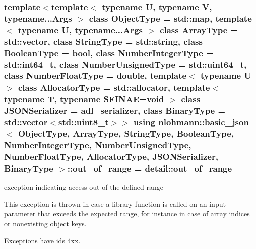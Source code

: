 \subsubsection[{\texorpdfstring{out\+\_\+of\+\_\+range}{out_of_range}}]{\setlength{\rightskip}{0pt plus 5cm}template$<$template$<$ typename U, typename V, typename...\+Args $>$ class Object\+Type = std\+::map, template$<$ typename U, typename...\+Args $>$ class Array\+Type = std\+::vector, class String\+Type  = std\+::string, class Boolean\+Type  = bool, class Number\+Integer\+Type  = std\+::int64\+\_\+t, class Number\+Unsigned\+Type  = std\+::uint64\+\_\+t, class Number\+Float\+Type  = double, template$<$ typename U $>$ class Allocator\+Type = std\+::allocator, template$<$ typename T, typename S\+F\+I\+N\+A\+E=void $>$ class J\+S\+O\+N\+Serializer = adl\+\_\+serializer, class Binary\+Type  = std\+::vector$<$std\+::uint8\+\_\+t$>$$>$ using {\bf nlohmann\+::basic\+\_\+json}$<$ Object\+Type, Array\+Type, String\+Type, Boolean\+Type, Number\+Integer\+Type, Number\+Unsigned\+Type, Number\+Float\+Type, Allocator\+Type, J\+S\+O\+N\+Serializer, Binary\+Type $>$\+::{\bf out\+\_\+of\+\_\+range} =  {\bf detail\+::out\+\_\+of\+\_\+range}}\hypertarget{classnlohmann_1_1basic__json_a2251d8523fa6d16c0fba6388ffa2ef8c}{}\label{classnlohmann_1_1basic__json_a2251d8523fa6d16c0fba6388ffa2ef8c}


exception indicating access out of the defined range 

This exception is thrown in case a library function is called on an input parameter that exceeds the expected range, for instance in case of array indices or nonexisting object keys.

Exceptions have ids 4xx.

